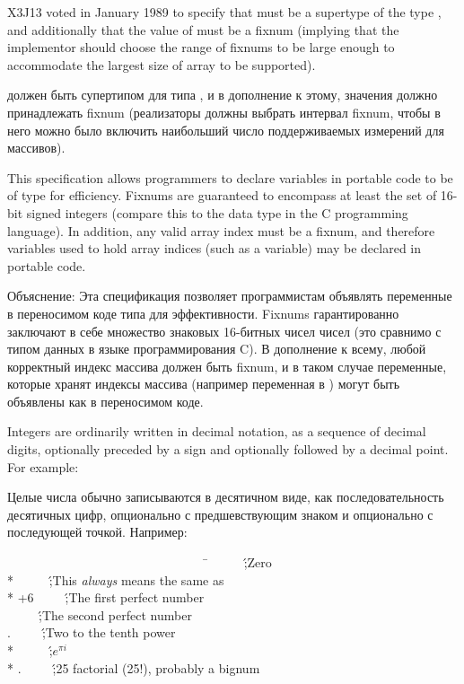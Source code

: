 \begin{new}
X3J13 voted in January 1989
to specify that  must be a supertype
of the type , and additionally that the value
of  must be a fixnum (implying that the implementor
should choose the range of fixnums to be large enough to accommodate the
largest size of array to be supported).

 должен быть супертипом для типа ,
и в дополнение к этому, значения  должно
принадлежать fixnum (реализаторы должны выбрать интервал fixnum,
чтобы в него можно было включить наибольший число поддерживаемых
измерений для массивов). 

\beforenoterule
\begin{rationale}
This specification allows programmers to declare variables in portable code
to be of type  for efficiency.  Fixnums are guaranteed to
encompass at least the set of 16-bit signed integers
(compare this to the data type  in the C programming language).
In addition, any valid array index must be a fixnum, and therefore variables
used to hold array indices (such as a  variable)
may be declared  in portable code.

Объяснение: Эта спецификация позволяет программистам объявлять
переменные в переносимом коде типа  для
эффективности. Fixnums гарантированно заключают в себе множество
знаковых 16-битных чисел чисел (это сравнимо с типом
данных  в языке программирования C). В дополнение к
всему, любой корректный индекс массива должен быть fixnum, и в
таком случае переменные, которые хранят индексы массива (например
переменная в ) могут быть объявлены как  в
переносимом коде. 
\end{rationale}
\afternoterule
\end{new}

Integers are ordinarily written in decimal notation, as a sequence
of decimal digits, optionally preceded by a sign and optionally followed
by a decimal point.
For example:

Целые числа обычно записываются в десятичном виде, как последовательность десятичных цифр, опционально с предшевствующим знаком и опционально с последующей точкой. Например:
\begin{lisp}
~~~~~~~~~~~~~~~~~~~~~~~~~~~~~~~~\=\kill
{}~~~~~\';\textrm{Zero} \\*
~~~~~\';\textrm{This \emph{always} means the same as } \\*
\>+6~~~~~\';\textrm{The first perfect number} \\
~~~~~\';\textrm{The second perfect number} \\
.~~~~~\';\textrm{Two to the tenth power} \\*
~~~~~\';\textrm{$e^{\pi i}$} \\*
.~~~~~\';\textrm{25 factorial (25!), probably a bignum}
\end{lisp}

